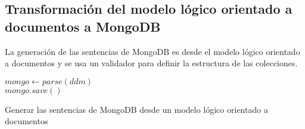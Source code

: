 \subsection{Transformación del modelo lógico orientado a documentos a MongoDB}\label{sec:script-mongoDB}
La generación de las sentencias de MongoDB es desde el modelo lógico orientado a documentos y se usa un validador para definir la estructura de las colecciones.


\begin{algorithm}[H]
  
        $mongo \gets parse(ddm)$\\
        $mongo.save()$
    \caption{Generar las sentencias de MongoDB desde un modelo lógico orientado a documentos}
  \end{algorithm}



